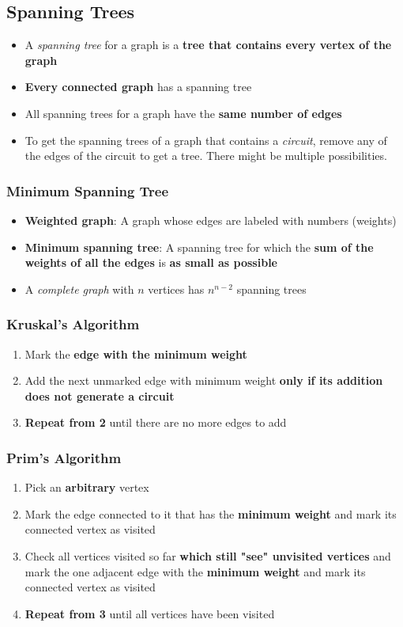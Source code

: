 \subsection{Spanning Trees}
\begin{itemize}
  \item A \textit{spanning tree} for a graph is a \textbf{tree that contains every vertex of the graph}
  \item \textbf{Every connected graph} has a spanning tree
  \item All spanning trees for a graph have the \textbf{same number of edges}
  \item To get the spanning trees of a graph that contains a \textit{circuit}, remove any of the edges of the circuit to get a tree. There might be multiple possibilities.
\end{itemize}

\subsubsection{Minimum Spanning Tree}
\begin{itemize}
  \item \textbf{Weighted graph}: A graph whose edges are labeled with numbers (weights)
  \item \textbf{Minimum spanning tree}: A spanning tree for which the \textbf{sum of the weights of all the edges} is \textbf{as small as possible}
  \item A \textit{complete graph} with $n$ vertices has $n^{n-2}$ spanning trees
\end{itemize}

\subsubsection{Kruskal's Algorithm}
\begin{enumerate}
  \item Mark the \textbf{edge with the minimum weight}
  \item Add the next unmarked edge with minimum weight \textbf{only if its addition does not generate a circuit}
  \item \textbf{Repeat from 2} until there are no more edges to add
\end{enumerate}

\subsubsection{Prim's Algorithm}
\begin{enumerate}
  \item Pick an \textbf{arbitrary} vertex
  \item Mark the edge connected to it that has the \textbf{minimum weight} and mark its connected vertex as visited
  \item Check all vertices visited so far \textbf{which still "see" unvisited vertices} and mark the one adjacent edge with the \textbf{minimum weight} and mark its connected vertex as visited
  \item \textbf{Repeat from 3} until all vertices have been visited
\end{enumerate}

